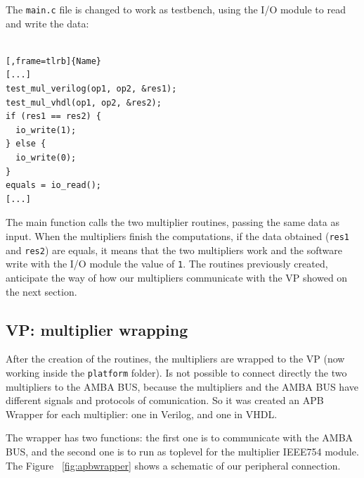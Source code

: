 \documentclass[]{IEEEtran}
\begin{document}
The \verb|main.c| file is changed to work as testbench, using the I/O module to read and write the data:
\\
\\
\noindent
\begin{minipage}{.45\textwidth}
	\begin{lstlisting}[,frame=tlrb]{Name}
[...]
test_mul_verilog(op1, op2, &res1);
test_mul_vhdl(op1, op2, &res2);
if (res1 == res2) {
  io_write(1);
} else {
  io_write(0);
}
equals = io_read();
[...]
	\end{lstlisting}
\end{minipage}\hfill
The main function calls the two multiplier routines, passing the same data as input. When the multipliers finish the computations, if the data obtained  (\verb|res1| and  \verb|res2|) are equals, it means that the two multipliers work and the software write with the I/O module the value of  \verb|1|.
The routines previously created, anticipate the way of how our multipliers communicate with the VP showed on the next section.
\subsection{VP: multiplier wrapping}
\label{sec:vphdlwrap}
After the creation of the routines, the multipliers are wrapped to the VP (now working inside the \verb|platform| folder).
Is not possible to connect directly the two multipliers to the AMBA BUS, because the multipliers and the AMBA BUS have different signals and  protocols of comunication. So it was created an APB Wrapper for each multiplier: one in Verilog, and one in VHDL.

The wrapper has two functions: the first one is to communicate with the AMBA BUS, and the second one is to run as toplevel for the multiplier IEEE754 module. The Figure ~\ref{fig:apbwrapper} shows a schematic of our peripheral connection.
\end{document}
